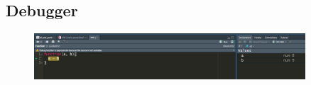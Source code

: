 \subsection{Debugger}

\begin{figure}[h]
    \centering
    \includegraphics[width=0.9\textwidth]{image/debugger.png}
\end{figure}